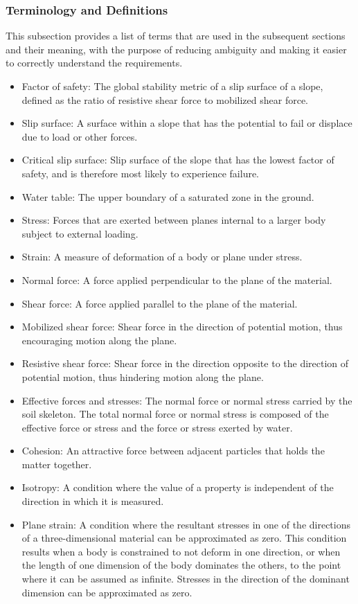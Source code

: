 \documentclass[12pt]{article}
\begin{document}
\subsubsection{Terminology and Definitions}
\label{Sec:TermDefs}
This subsection provides a list of terms that are used in the subsequent sections and their meaning, with the purpose of reducing ambiguity and making it easier to correctly understand the requirements.
\begin{itemize}
\item{Factor of safety: The global stability metric of a slip surface of a slope, defined as the ratio of resistive shear force to mobilized shear force.}
\item{Slip surface: A surface within a slope that has the potential to fail or displace due to load or other forces.}
\item{Critical slip surface: Slip surface of the slope that has the lowest factor of safety, and is therefore most likely to experience failure.}
\item{Water table: The upper boundary of a saturated zone in the ground.}
\item{Stress: Forces that are exerted between planes internal to a larger body subject to external loading.}
\item{Strain: A measure of deformation of a body or plane under stress.}
\item{Normal force: A force applied perpendicular to the plane of the material.}
\item{Shear force: A force applied parallel to the plane of the material.}
\item{Mobilized shear force: Shear force in the direction of potential motion, thus encouraging motion along the plane.}
\item{Resistive shear force: Shear force in the direction opposite to the direction of potential motion, thus hindering motion along the plane.}
\item{Effective forces and stresses: The normal force or normal stress carried by the soil skeleton. The total normal force or normal stress is composed of the effective force or stress and the force or stress exerted by water.}
\item{Cohesion: An attractive force between adjacent particles that holds the matter together.}
\item{Isotropy: A condition where the value of a property is independent of the direction in which it is measured.}
\item{Plane strain: A condition where the resultant stresses in one of the directions of a  three-dimensional material can be approximated as zero. This condition results when a body is constrained to not deform in one direction, or when the length of one dimension of the body dominates the others, to the point where it can be assumed as infinite. Stresses in the direction of the dominant dimension can be approximated as zero.}
\end{itemize}
\end{document}
